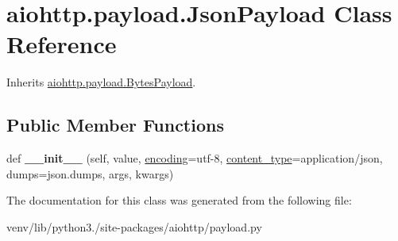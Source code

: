 \hypertarget{classaiohttp_1_1payload_1_1_json_payload}{}\section{aiohttp.\+payload.\+Json\+Payload Class Reference}
\label{classaiohttp_1_1payload_1_1_json_payload}


Inherits \hyperlink{classaiohttp_1_1payload_1_1_bytes_payload}{aiohttp.\+payload.\+Bytes\+Payload}.

\subsection*{Public Member Functions}
\begin{DoxyCompactItemize}
\item 
\mbox{\label{classaiohttp_1_1payload_1_1_json_payload_a886fb79eefd228e692f4c782417f6ffe}} 
def {\bfseries \+\_\+\+\_\+init\+\_\+\+\_\+} (self, value, \hyperlink{classaiohttp_1_1payload_1_1_payload_a32f545f68c7bf65bee28f566b35edb4e}{encoding}=\textquotesingle{}utf-\/8\textquotesingle{}, \hyperlink{classaiohttp_1_1payload_1_1_payload_ab7f478716f0cb49905362cc8faf06ec3}{content\+\_\+type}=\textquotesingle{}application/json\textquotesingle{}, dumps=json.\+dumps, args, kwargs)
\end{DoxyCompactItemize}


The documentation for this class was generated from the following file\+:\begin{DoxyCompactItemize}
\item 
venv/lib/python3./site-\/packages/aiohttp/payload.\+py\end{DoxyCompactItemize}
